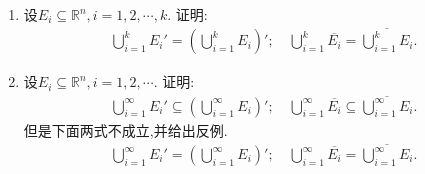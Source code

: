 \documentclass[../../main.tex]{subfiles}%
\begin{document}
\begin{proposition}
\begin{enumerate}[(1)]
\item 设$E_i \subseteq \mathbb{R}^n, i=1,2,\cdots,k$. 证明:
\begin{align*}
\bigcup_{i=1}^k E_i' = \left( \bigcup_{i=1}^k E_i \right)'; \quad \bigcup_{i=1}^k \overline{E_i} = \overline{\bigcup_{i=1}^k E_i}.
\end{align*}

\item 设$E_i \subseteq \mathbb{R}^n, i=1,2,\cdots$. 证明:
\begin{align*}
\bigcup_{i=1}^\infty E_i' \subseteq \left( \bigcup_{i=1}^\infty E_i \right)'; \quad \bigcup_{i=1}^\infty \overline{E_i} \subseteq \overline{\bigcup_{i=1}^\infty E_i}.
\end{align*}
但是下面两式不成立,并给出反例.
\begin{align*}
\bigcup_{i=1}^\infty E_i' = \left( \bigcup_{i=1}^\infty E_i \right)'; \quad \bigcup_{i=1}^\infty \overline{E_i} = \overline{\bigcup_{i=1}^\infty E_i}.
\end{align*}
\end{enumerate}
\end{proposition}
\end{document}
